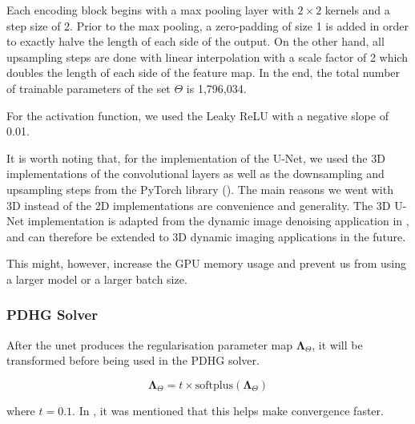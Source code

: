 \documentclass[12pt]{article}
\begin{document}
Each encoding block begins with a max pooling layer with $2 \times 2$ kernels and a step size of 2.
Prior to the max pooling, a zero-padding of size 1 is added in order to exactly halve the length of each side of the output.
On the other hand, all upsampling steps are done with linear interpolation with a scale factor of 2 which doubles the length of each side of the feature map.
In the end, the total number of trainable parameters of the set $\Theta$ is 1,796,034.

For the activation function, we used the Leaky ReLU with a negative slope of 0.01.


It is worth noting that, for the implementation of the U-Net, 
we used the 3D implementations of the convolutional layers as well as the downsampling and upsampling steps from the PyTorch library (\cite{PyTorch}).
The main reasons we went with 3D instead of the 2D implementations are convenience and generality.
The 3D U-Net implementation is adapted from the dynamic image denoising application in \cite{kofler2023learning}, and can therefore be extended to 3D dynamic imaging applications in the future.

This might, however, increase the GPU memory usage and prevent us from using a larger model or a larger batch size.




\subsubsection{PDHG Solver}

After the unet produces the regularisation parameter map $\mathbf{\Lambda}_{\Theta}$,
it will be transformed before being used in the PDHG solver.

\begin{equation}
    \mathbf{\Lambda}_{\Theta} = t \times \text{softplus}(\mathbf{\Lambda}_{\Theta})
    \label{eq:default-softplus}
\end{equation}

where $t = 0.1$.
In \cite{kofler2023learning}, it was mentioned that this helps make convergence faster.


\end{document}
